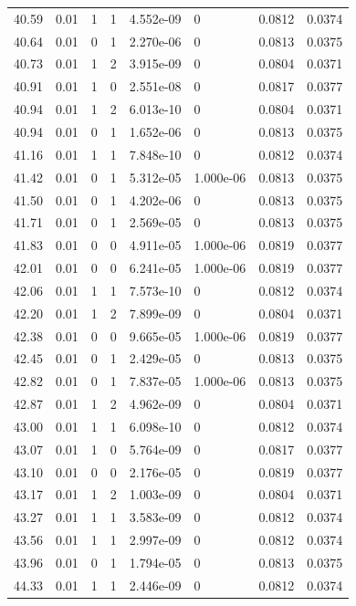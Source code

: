\documentclass[preview]{standalone}
\begin{document}
{{{{{{\begin{tabular}{L{1.2cm}C{1.2cm} C{0.3cm}C{0.5cm} C{1.4cm}C{1.4cm} C{1.4cm}C{1.4cm}}
  40.59  &  0.01  & 1     &  1 &  4.552e-09  & 0  & 0.0812 &  0.0374   \\ 
  40.64  &  0.01  & 0     &  1 &  2.270e-06  & 0  & 0.0813 &  0.0375   \\ 
  40.73  &  0.01  & 1     &  2 &  3.915e-09  & 0  & 0.0804 &  0.0371   \\ 
  40.91  &  0.01  & 1     &  0 &  2.551e-08  & 0  & 0.0817 &  0.0377   \\ 
  40.94  &  0.01  & 1     &  2 &  6.013e-10  & 0  & 0.0804 &  0.0371   \\ 
  40.94  &  0.01  & 0     &  1 &  1.652e-06  & 0  & 0.0813 &  0.0375   \\ 
  41.16  &  0.01  & 1     &  1 &  7.848e-10  & 0  & 0.0812 &  0.0374   \\ 
  41.42  &  0.01  & 0     &  1 &  5.312e-05  & 1.000e-06  & 0.0813 &  0.0375   \\ 
  41.50  &  0.01  & 0     &  1 &  4.202e-06  & 0  & 0.0813 &  0.0375   \\ 
  41.71  &  0.01  & 0     &  1 &  2.569e-05  & 0  & 0.0813 &  0.0375   \\ 
  41.83  &  0.01  & 0     &  0 &  4.911e-05  & 1.000e-06  & 0.0819 &  0.0377   \\ 
  42.01  &  0.01  & 0     &  0 &  6.241e-05  & 1.000e-06  & 0.0819 &  0.0377   \\ 
  42.06  &  0.01  & 1     &  1 &  7.573e-10  & 0  & 0.0812 &  0.0374   \\ 
  42.20  &  0.01  & 1     &  2 &  7.899e-09  & 0  & 0.0804 &  0.0371   \\ 
  42.38  &  0.01  & 0     &  0 &  9.665e-05  & 1.000e-06  & 0.0819 &  0.0377   \\ 
  42.45  &  0.01  & 0     &  1 &  2.429e-05  & 0  & 0.0813 &  0.0375   \\ 
  42.82  &  0.01  & 0     &  1 &  7.837e-05  & 1.000e-06  & 0.0813 &  0.0375   \\ 
  42.87  &  0.01  & 1     &  2 &  4.962e-09  & 0  & 0.0804 &  0.0371   \\ 
  43.00  &  0.01  & 1     &  1 &  6.098e-10  & 0  & 0.0812 &  0.0374   \\ 
  43.07  &  0.01  & 1     &  0 &  5.764e-09  & 0  & 0.0817 &  0.0377   \\ 
  43.10  &  0.01  & 0     &  0 &  2.176e-05  & 0  & 0.0819 &  0.0377   \\ 
  43.17  &  0.01  & 1     &  2 &  1.003e-09  & 0  & 0.0804 &  0.0371   \\ 
  43.27  &  0.01  & 1     &  1 &  3.583e-09  & 0  & 0.0812 &  0.0374   \\ 
  43.56  &  0.01  & 1     &  1 &  2.997e-09  & 0  & 0.0812 &  0.0374   \\ 
  43.96  &  0.01  & 0     &  1 &  1.794e-05  & 0  & 0.0813 &  0.0375   \\ 
  44.33  &  0.01  & 1     &  1 &  2.446e-09  & 0  & 0.0812 &  0.0374   \\ 
\hline 
\end{tabular} 

}}}}}}
\end{document}
